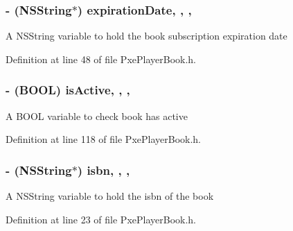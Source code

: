 \hypertarget{interface_pxe_player_book_a6ac644b4bfb5a693764b81454c10ee0a}{
\subsubsection[{expiration\-Date}]{\setlength{\rightskip}{0pt plus 5cm}-\/ (N\-S\-String$\ast$) expiration\-Date\hspace{0.3cm}{\ttfamily [read]}, {\ttfamily [write]}, {\ttfamily [nonatomic]}, {\ttfamily [strong]}}}\label{interface_pxe_player_book_a6ac644b4bfb5a693764b81454c10ee0a}
A N\-S\-String variable to hold the book subscription expiration date 

Definition at line 48 of file Pxe\-Player\-Book.\-h.

\hypertarget{interface_pxe_player_book_a925ea189e97b526295cecdc85f13279b}{
\subsubsection[{is\-Active}]{\setlength{\rightskip}{0pt plus 5cm}-\/ (B\-O\-O\-L) is\-Active\hspace{0.3cm}{\ttfamily [read]}, {\ttfamily [write]}, {\ttfamily [nonatomic]}, {\ttfamily [assign]}}}\label{interface_pxe_player_book_a925ea189e97b526295cecdc85f13279b}
A B\-O\-O\-L variable to check book has active 

Definition at line 118 of file Pxe\-Player\-Book.\-h.

\hypertarget{interface_pxe_player_book_ad6112557a3413f32dae81ca61db34840}{
\subsubsection[{isbn}]{\setlength{\rightskip}{0pt plus 5cm}-\/ (N\-S\-String$\ast$) isbn\hspace{0.3cm}{\ttfamily [read]}, {\ttfamily [write]}, {\ttfamily [nonatomic]}, {\ttfamily [strong]}}}\label{interface_pxe_player_book_ad6112557a3413f32dae81ca61db34840}
A N\-S\-String variable to hold the isbn of the book 

Definition at line 23 of file Pxe\-Player\-Book.\-h.

